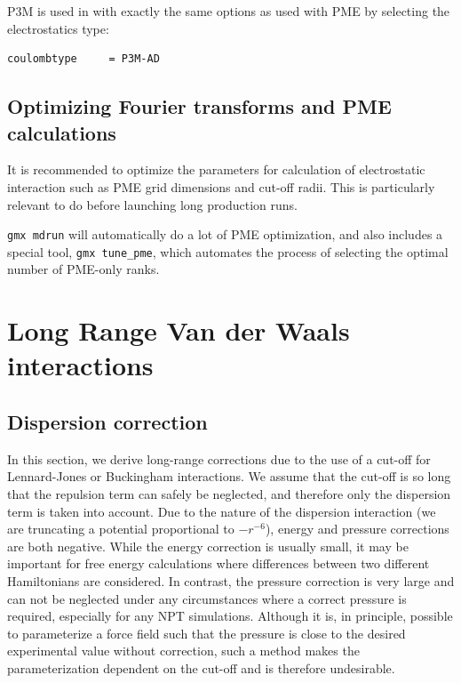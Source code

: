 P3M is used in {\gromacs} with exactly the same options as used with PME
by selecting the electrostatics type:
\begin{verbatim}
coulombtype     = P3M-AD
\end{verbatim}

\subsection{Optimizing Fourier transforms and PME calculations}
It is recommended to optimize the parameters for calculation of
electrostatic interaction such as PME grid dimensions and cut-off radii.
This is particularly relevant to do before launching long production runs.

{\tt gmx mdrun} will automatically do a lot of PME optimization, and
{\gromacs} also includes a special tool, {\tt gmx tune_pme}, which
automates the process of selecting the optimal number of PME-only ranks.


\section{Long Range Van der Waals interactions}
\subsection{Dispersion correction}
In this section, we derive long-range corrections due to the use of a
cut-off for Lennard-Jones or Buckingham interactions.
We assume that the cut-off is
so long that the repulsion term can safely be neglected, and therefore
only the dispersion term is taken into account. Due to the nature of
the dispersion interaction (we are truncating a potential proportional
to $-r^{-6}$), energy and pressure corrections are both negative. While
the energy correction is usually small, it may be important for free
energy calculations where differences between two different Hamiltonians
are considered. In contrast, the pressure correction is very large and
can not be neglected under any circumstances where a correct pressure is
required, especially for any NPT simulations. Although it is, in
principle, possible to parameterize a force field such that the pressure
is close to the desired experimental value without correction, such a
method makes the parameterization dependent on the cut-off and is therefore
undesirable.

